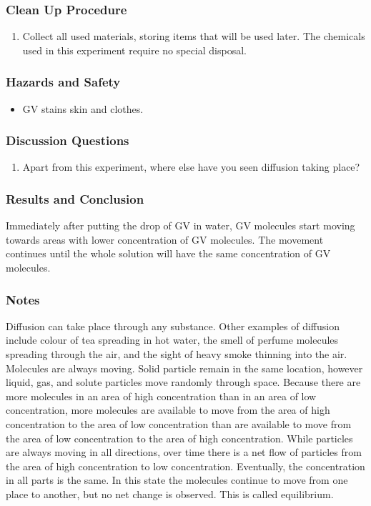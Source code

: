 \subsubsection*{Clean Up Procedure}
\begin{enumerate}
\item{Collect all used materials, storing items that will be used later. The chemicals used in this experiment require no special disposal.}
\end{enumerate}

\subsubsection*{Hazards and Safety}
\begin{itemize}
\item{GV stains skin and clothes.}
\end{itemize}

\subsubsection*{Discussion Questions}
\begin{enumerate}
\item{Apart from this experiment, where else have you seen diffusion taking place?}
\end{enumerate}

\subsubsection*{Results and Conclusion}
Immediately after putting the drop of GV in water, GV molecules start moving towards areas with lower concentration of GV molecules. The movement continues until the whole solution will have the same concentration of GV molecules.

\subsubsection*{Notes}
Diffusion can take place through any substance. Other examples of diffusion include colour of tea spreading in hot water, the smell of perfume molecules spreading through the air, and the sight of heavy smoke thinning into the air.
Molecules are always moving. Solid particle remain in the same location, however liquid, gas, and solute particles move randomly through space. Because there are more molecules in an area of high concentration than in an area of low concentration, more molecules are available to move from the area of high concentration to the area of low concentration than are available to move from the area of low concentration to the area of high concentration. While particles are always moving in all directions, over time there is a net flow of particles from the area of high concentration to low concentration. Eventually, the concentration in all parts is the same. In this state the molecules continue to move from one place to another, but no net change is observed. This is called equilibrium.


